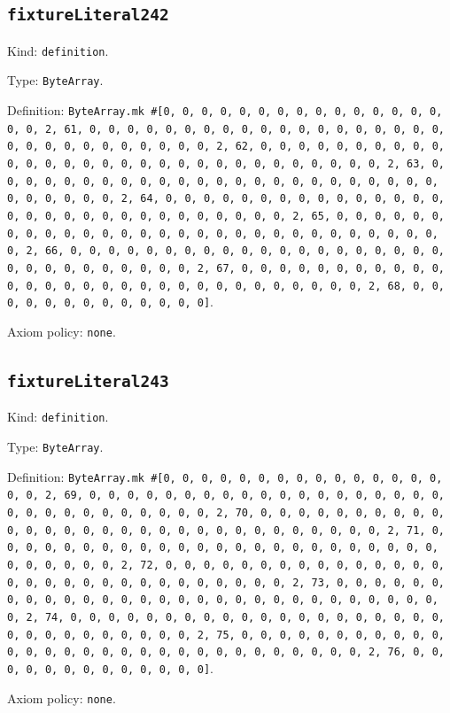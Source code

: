 \documentclass[11pt]{article}
\begin{document}
\subsection*{\texttt{fixtureLiteral242}}
\noindent Kind: \texttt{definition}.\par
\noindent Type: \texttt{ByteArray}.\par
\noindent Definition: \texttt{ByteArray.mk \#[0, 0, 0, 0, 0, 0, 0, 0, 0, 0, 0, 0, 0, 0, 0, 0, 0, 2, 61, 0, 0, 0, 0, 0, 0, 0, 0, 0, 0, 0, 0, 0, 0, 0, 0, 0, 0, 0, 0, 0, 0, 0, 0, 0, 0, 0, 0, 0, 0, 2, 62, 0, 0, 0, 0, 0, 0, 0, 0, 0, 0, 0, 0, 0, 0, 0, 0, 0, 0, 0, 0, 0, 0, 0, 0, 0, 0, 0, 0, 0, 0, 2, 63, 0, 0, 0, 0, 0, 0, 0, 0, 0, 0, 0, 0, 0, 0, 0, 0, 0, 0, 0, 0, 0, 0, 0, 0, 0, 0, 0, 0, 0, 0, 2, 64, 0, 0, 0, 0, 0, 0, 0, 0, 0, 0, 0, 0, 0, 0, 0, 0, 0, 0, 0, 0, 0, 0, 0, 0, 0, 0, 0, 0, 0, 0, 2, 65, 0, 0, 0, 0, 0, 0, 0, 0, 0, 0, 0, 0, 0, 0, 0, 0, 0, 0, 0, 0, 0, 0, 0, 0, 0, 0, 0, 0, 0, 0, 2, 66, 0, 0, 0, 0, 0, 0, 0, 0, 0, 0, 0, 0, 0, 0, 0, 0, 0, 0, 0, 0, 0, 0, 0, 0, 0, 0, 0, 0, 0, 0, 2, 67, 0, 0, 0, 0, 0, 0, 0, 0, 0, 0, 0, 0, 0, 0, 0, 0, 0, 0, 0, 0, 0, 0, 0, 0, 0, 0, 0, 0, 0, 0, 2, 68, 0, 0, 0, 0, 0, 0, 0, 0, 0, 0, 0, 0, 0]}.\par
\noindent Axiom policy: \texttt{none}.\par
\subsection*{\texttt{fixtureLiteral243}}
\noindent Kind: \texttt{definition}.\par
\noindent Type: \texttt{ByteArray}.\par
\noindent Definition: \texttt{ByteArray.mk \#[0, 0, 0, 0, 0, 0, 0, 0, 0, 0, 0, 0, 0, 0, 0, 0, 0, 2, 69, 0, 0, 0, 0, 0, 0, 0, 0, 0, 0, 0, 0, 0, 0, 0, 0, 0, 0, 0, 0, 0, 0, 0, 0, 0, 0, 0, 0, 0, 0, 2, 70, 0, 0, 0, 0, 0, 0, 0, 0, 0, 0, 0, 0, 0, 0, 0, 0, 0, 0, 0, 0, 0, 0, 0, 0, 0, 0, 0, 0, 0, 0, 2, 71, 0, 0, 0, 0, 0, 0, 0, 0, 0, 0, 0, 0, 0, 0, 0, 0, 0, 0, 0, 0, 0, 0, 0, 0, 0, 0, 0, 0, 0, 0, 2, 72, 0, 0, 0, 0, 0, 0, 0, 0, 0, 0, 0, 0, 0, 0, 0, 0, 0, 0, 0, 0, 0, 0, 0, 0, 0, 0, 0, 0, 0, 0, 2, 73, 0, 0, 0, 0, 0, 0, 0, 0, 0, 0, 0, 0, 0, 0, 0, 0, 0, 0, 0, 0, 0, 0, 0, 0, 0, 0, 0, 0, 0, 0, 2, 74, 0, 0, 0, 0, 0, 0, 0, 0, 0, 0, 0, 0, 0, 0, 0, 0, 0, 0, 0, 0, 0, 0, 0, 0, 0, 0, 0, 0, 0, 0, 2, 75, 0, 0, 0, 0, 0, 0, 0, 0, 0, 0, 0, 0, 0, 0, 0, 0, 0, 0, 0, 0, 0, 0, 0, 0, 0, 0, 0, 0, 0, 0, 2, 76, 0, 0, 0, 0, 0, 0, 0, 0, 0, 0, 0, 0, 0]}.\par
\noindent Axiom policy: \texttt{none}.\par
\end{document}
